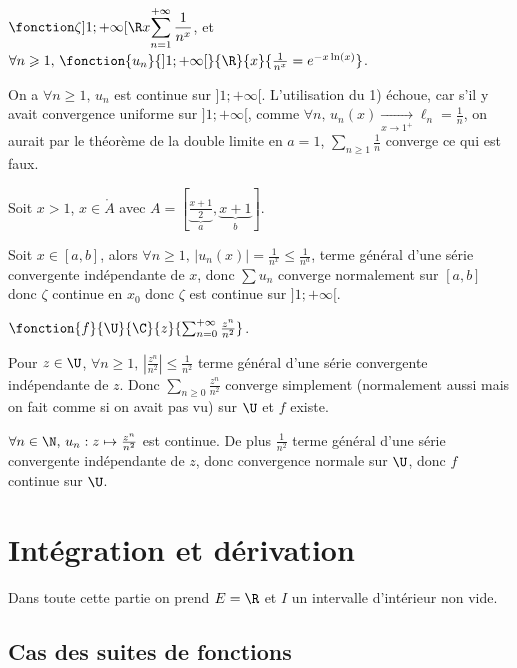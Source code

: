 \begin{exemple}
    $\displaystyle \fonction \zeta{]1; +\infty[}{\R}{x}{\sum_{n = 1}^{+ \infty} \frac 1 {n^x}}$, et 
    $\forall n \geqslant 1, \, \fonction{u_n}{]1; +\infty[}{\R}{x}{\frac 1 {n^x} = e^{-x \ln(x)}}$. 

    On a $\forall n \geqslant 1, \, u_n$ est continue sur $]1; +\infty[$. L'utilisation du 1) échoue, car 
    s'il y avait convergence uniforme sur $]1; +\infty[$, comme $\forall n, \, u_n(x) \xrightarrow[x \to 1^+]{} \ell_n = \frac 1 n$,
    on aurait par le théorème de la double limite en $a = 1$, $\sum_{n \geqslant 1 } \frac 1 n $ converge ce qui est faux. 

    \svspace Soit $x > 1$, $x \in \mathring A$ avec $A = \left[ \underbrace{\frac{x + 1}{2}}_{ a }, \underbrace{x + 1}_{ b} \right]$.

    Soit $x \in [a, b]$, alors $\forall n \geqslant 1, \, \left| u_n(x) \right| = \frac 1 {n^x} \leqslant \frac 1 {n^a}$, terme 
    général d'une série convergente indépendante de $x$, donc $\sum u_n$ converge normalement sur $[a, b]$ 
    donc $\zeta$ continue en $x_0$ donc $\zeta$ est continue sur $]1; +\infty[$.
\end{exemple}

\begin{exemple}
    $\fonction{f}{\U}{\C}{z}{\sum_{n = 0}^{+ \infty} \frac{z^n }{n^2}}$. 

    Pour $z \in \U$, $\forall n \geqslant 1, \, \left| \frac{z^n }{n^2} \right| \leqslant \frac 1 {n^2}$ terme général
    d'une série convergente indépendante de $z$. Donc $\sum_{n \geqslant 0} \frac{z^n }{n^2}$ converge simplement (normalement aussi mais on fait comme si 
    on avait pas vu) sur $\U$ et $f$ existe. 

    $\forall n \in \N, \, u_n : z \mapsto \frac{z^n }{n^2}$ est continue. De plus 
    $\frac 1 {n^2}$ terme général d'une série convergente indépendante de $z$, donc convergence 
    normale sur $\U$, donc $f$ continue sur $\U$.
\end{exemple}

\section{Intégration et dérivation}

Dans toute cette partie on prend $E = \R$ et $I$ un intervalle d'intérieur non vide.

\subsection{Cas des suites de fonctions}

